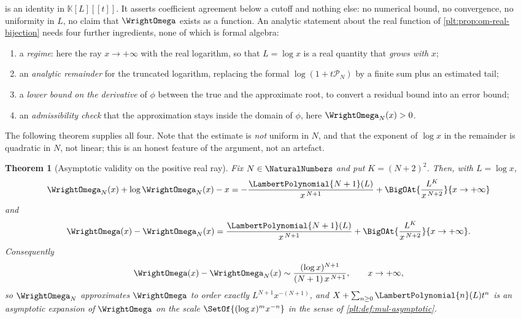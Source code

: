 \documentclass[11pt,oneside]{article}
\theoremstyle{plain}
\newtheorem{theorem}{Theorem}[section]
\theoremstyle{definition}
\theoremstyle{remark}
\newcommand{\K}{\mathbb{K}}
\newcommand{\LamP}[1]{\LambertPolynomial{#1}}
\begin{document}
 is an identity in \(\K[L][[t]]\).  It asserts
coefficient agreement below a cutoff and nothing else: no numerical bound, no
convergence, no uniformity in \(L\), no claim that \(\WrightOmega\) exists as
a function.  An analytic statement about the real function of
\cref{plt:prop:om-real-bijection} needs four further ingredients, none of
which is formal algebra:

\begin{enumerate}
\item a \emph{regime}: here the ray \(x\to+\infty\) with the real logarithm,
      so that \(L=\log x\) is a real quantity that \emph{grows with} \(x\);
\item an \emph{analytic remainder} for the truncated logarithm, replacing the
      formal \(\log(1+t\mathcal P_N)\) by a finite sum plus an estimated tail;
\item a \emph{lower bound on the derivative} of \(\phi\) between the true and
      the approximate root, to convert a residual bound into an error bound;
\item an \emph{admissibility check} that the approximation stays inside the
      domain of \(\phi\), here \(\WrightOmega_N(x)>0\).
\end{enumerate}

The following theorem supplies all four.  Note that the estimate is
\emph{not} uniform in \(N\), and that the exponent of \(\log x\) in the
remainder is quadratic in \(N\), not linear; this is an honest feature of the
argument, not an artefact.

\begin{theorem}[Asymptotic validity on the positive real ray]
\label{plt:thm:om-analytic}
Fix \(N\in\NaturalNumbers\) and put \(K=(N+2)^{2}\).  Then, with
\(L=\log x\),
\begin{equation}\label{plt:eq:om-analytic-residual}
 \WrightOmega_N(x)+\log\WrightOmega_N(x)-x
 =-\frac{\LamP{N+1}(L)}{x^{\,N+1}}
  +\BigOAt{\frac{L^{K}}{x^{\,N+2}}}{x\to+\infty}
\end{equation}
and
\begin{equation}\label{plt:eq:om-analytic-error}
 \WrightOmega(x)-\WrightOmega_N(x)
 =\frac{\LamP{N+1}(L)}{x^{\,N+1}}
  +\BigOAt{\frac{L^{K}}{x^{\,N+2}}}{x\to+\infty}.
\end{equation}
Consequently
\begin{equation}\label{plt:eq:om-sharp-order}
 \WrightOmega(x)-\WrightOmega_N(x)
 \sim\frac{(\log x)^{N+1}}{(N+1)\,x^{\,N+1}},
 \qquad x\to+\infty,
\end{equation}
so \(\WrightOmega_N\) approximates \(\WrightOmega\) to order exactly
\(L^{N+1}x^{-(N+1)}\), and
\(X+\sum_{n\ge0}\LamP{n}(L)t^{n}\) is an asymptotic expansion of
\(\WrightOmega\) on the scale \(\SetOf{(\log x)^{m}x^{-n}}\) in the sense of
\cref{plt:def:mul-asymptotic}.
\end{theorem}
\end{document}
